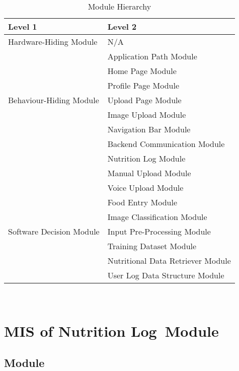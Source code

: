 \documentclass[12pt, titlepage]{article}
\begin{document}
\begin{table}[h!]
	\centering
	\begin{tabular}{p{} p{}}
		\toprule
		\textbf{Level 1} & \textbf{Level 2}\\
		\midrule
		
		{Hardware-Hiding Module} & N/A \\
		\midrule
		
		\multirow{7}{0.3\textwidth}{Behaviour-Hiding Module} & Application Path Module\\
		& Home Page Module\\
		& Profile Page Module\\
		& Upload Page Module\\
		& Image Upload Module\\
		& Navigation Bar Module\\
		& Backend Communication Module\\ 
		& Nutrition Log Module\\
		& Manual Upload Module \\
		& Voice Upload Module \\
		& Food Entry Module \\
		\midrule
		
		\multirow{3}{0.3\textwidth}{Software Decision Module} & Image Classification Module\\
		& Input Pre-Processing Module\\
		& Training Dataset Module\\
		& Nutritional Data Retriever Module\\
		& User Log Data Structure Module\\
		\bottomrule
		
	\end{tabular}
	\caption{Module Hierarchy}
	\label{TblMH}
\end{table}

\newpage
~\newpage

\section{MIS of Nutrition Log Module} \label{Module} 



\subsection{Module}
\end{document}
